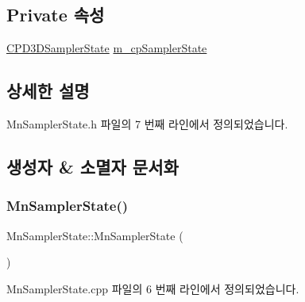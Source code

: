 \subsection*{Private 속성}
\begin{DoxyCompactItemize}
\item 
\hyperlink{namespace_m_n_l_ae0141196161ecb3d3055523077ca3aa1}{C\+P\+D3\+D\+Sampler\+State} \hyperlink{class_m_n_l_1_1_mn_sampler_state_a6f1c6720b585541557ebd9fee09af0fe}{m\+\_\+cp\+Sampler\+State}
\end{DoxyCompactItemize}


\subsection{상세한 설명}


Mn\+Sampler\+State.\+h 파일의 7 번째 라인에서 정의되었습니다.



\subsection{생성자 \& 소멸자 문서화}
\mbox{\label{class_m_n_l_1_1_mn_sampler_state_a91fd21a75e70068eb6ca7c6e7e9f4d97}} 
\subsubsection{\texorpdfstring{Mn\+Sampler\+State()}{MnSamplerState()}}
{\footnotesize\ttfamily Mn\+Sampler\+State\+::\+Mn\+Sampler\+State (\begin{DoxyParamCaption}{ }\end{DoxyParamCaption})}



Mn\+Sampler\+State.\+cpp 파일의 6 번째 라인에서 정의되었습니다.

\mbox{\label{class_m_n_l_1_1_mn_sampler_state_aecb465a7b7c0e81aee3c10dbe1ed8164}} 
